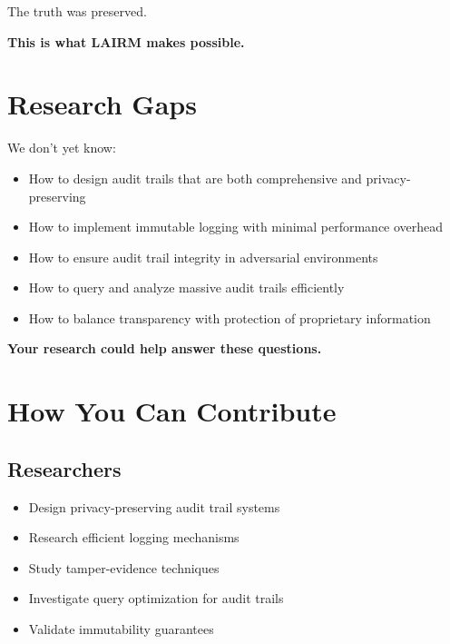 The truth was preserved.

\textbf{This is what LAIRM makes possible.}

\vspace{0.5cm}

\section{Research Gaps}

We don't yet know:

\begin{itemize}
    \item How to design audit trails that are both comprehensive and privacy-preserving
    
    \item How to implement immutable logging with minimal performance overhead
    
    \item How to ensure audit trail integrity in adversarial environments
    
    \item How to query and analyze massive audit trails efficiently
    
    \item How to balance transparency with protection of proprietary information
\end{itemize}

\textbf{Your research could help answer these questions.}

\vspace{0.5cm}

\section{How You Can Contribute}

\subsection{Researchers}

\begin{itemize}
    \item Design privacy-preserving audit trail systems
    \item Research efficient logging mechanisms
    \item Study tamper-evidence techniques
    \item Investigate query optimization for audit trails
    \item Validate immutability guarantees
\end{itemize}


